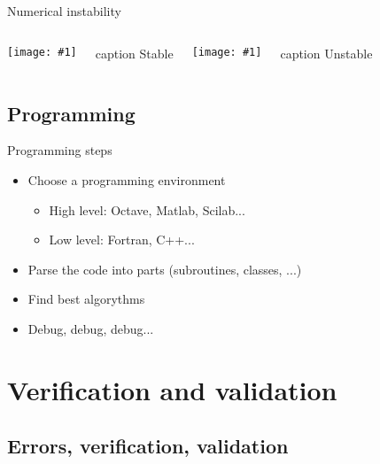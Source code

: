 \documentclass{beamer}
\newcommand{\captionbox}[1]{%
	\begin{beamercolorbox}[ht=2.5ex,dp=1ex,center]{caption}%
		#1%
	\end{beamercolorbox}}
\newcommand{\figurebox}[2]{%
	\texttt{[image: \#1]}\\%
	\captionbox{#2}}
\begin{document}
\begin{frame}{Numerical instability}
	\begin{columns}
	\column{60mm}
		\figurebox{bueler-2010-stable}{Stable}
	\column{60mm}
		\figurebox{bueler-2010-unstable}{Unstable}
	\end{columns}
\end{frame}

\subsection{Programming}

\begin{frame}{Programming steps}
	\begin{itemize}
		\item Choose a programming environment
			\begin{itemize}
				\item High level: Octave, Matlab, Scilab...
				\item Low level: Fortran, C++...
			\end{itemize}
		\item Parse the code into parts (subroutines, classes, ...)
		\item Find best algorythms
		\item Debug, debug, debug...
	\end{itemize}
\end{frame}



\section{Verification and validation}

\subsection{Errors, verification, validation}

\end{document}
